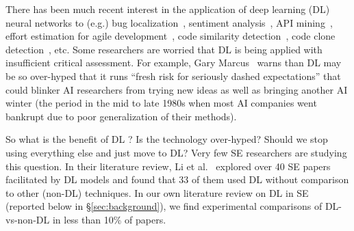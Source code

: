 \documentclass[10pt,compsoc,twocolumn]{IEEEtran}
\begin{document}
 There has been much recent interest in the application
of deep learning (DL) neural
networks to (e.g.)   
bug localization~\cite{huo2019deep}, 
sentiment analysis~\cite{lin2018sentiment,guo2017semantically}, 
API mining~\cite{chen2019mining,gu2016deep,nguyen2017exploring}, effort estimation for agile development~\cite{choetkiertikul2018deep}, code similarity detection~\cite{zhao2018deepsim},
code clone detection~\cite{white2016deep}, etc.
Some researchers are worried that DL is being applied with insufficient critical assessment. 
For example, Gary Marcus~\cite{marcus2018deep} 
warns than DL may be so over-hyped that it runs  ``fresh risk for seriously dashed expectations'' that could blinker AI researchers from trying new ideas as well as
bringing  another AI winter (the period in the mid to late 1980s when most AI companies went bankrupt due to poor generalization
of their methods).


So what is the benefit of DL ? Is the technology over-hyped? Should we stop using everything else and just move to DL?
Very few SE researchers are studying this question.
In their literature review, Li et al.~\cite{li2018deep} explored over 40 SE papers facilitated by DL models and found that 33 of them used  DL without comparison to   other (non-DL) techniques. 
In our own literature review on DL in SE (reported below in \S\ref{sec:background}), we       find    experimental
comparisons of DL-vs-non-DL in  less than 10\% of    papers.
\end{document}

